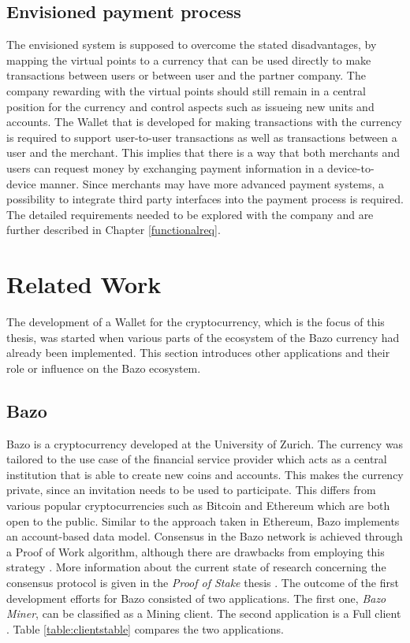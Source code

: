 \subsection{Envisioned payment process}\label{envisionedpaymentprocess}
The envisioned system is supposed to overcome the stated disadvantages, by mapping the virtual points to a currency that can be used directly to make transactions between users or between user and the partner company.
The company rewarding with the virtual points should still remain in a central position for the currency and control aspects such as issueing new units and accounts.
The Wallet that is developed for making transactions with the currency is required to support user-to-user transactions as well as transactions between a user and the merchant. This implies that there is a way that both merchants and users can request money by exchanging payment information in a device-to-device manner. Since merchants may have more advanced payment systems, a possibility to integrate third party interfaces into the payment process is required. The detailed requirements needed to be explored with the company and are further described in Chapter \ref{functionalreq}.


\section{Related Work}
The development of a Wallet for the cryptocurrency, which is the focus of this thesis, was started when various parts of the ecosystem of the Bazo currency had already been implemented. This section introduces other applications and their role or influence on the Bazo ecosystem.
\subsection{Bazo}
Bazo is a cryptocurrency developed at the University of Zurich. The currency was tailored to the use case of the financial service provider which acts as a central institution that is able to create new coins and accounts. This makes the currency private, since an invitation needs to be used to participate. This differs from various popular cryptocurrencies such as Bitcoin and Ethereum which are both open to the public. Similar to the approach taken in Ethereum, Bazo implements an account-based data model. Consensus in the Bazo network is achieved through a Proof of Work algorithm, although there are drawbacks from employing this strategy \cite{lisg}. More information about the current state of research concerning the consensus protocol is given in the \textit{Proof of Stake} thesis \cite{proofofstake}.
The outcome of the first development efforts for Bazo consisted of two applications. The first one, \textit{Bazo Miner}, can be classified as a Mining client. The second application is a Full client \cite{bitcoinclients}. Table \ref{table:clientstable} compares the two applications.
